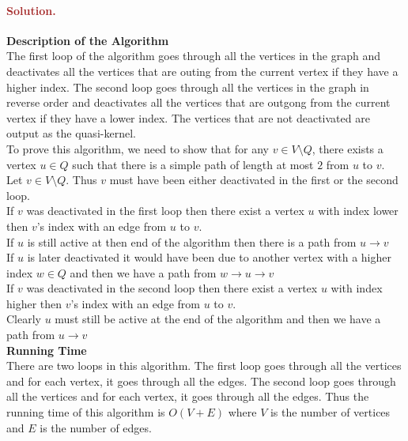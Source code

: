 \paragraph{\textcolor{brown}{Solution.}}
\textbf{Description of the Algorithm}\\
The first loop of the algorithm goes through all the vertices in the graph and deactivates all the vertices that are outing from the current vertex if they have a higher index. The second loop goes through all the vertices in the graph in reverse order and deactivates all the vertices that are outgong from the current vertex if they have a lower index. The vertices that are not deactivated are output as the quasi-kernel.\\
To prove this algorithm, we need to show that for any $v \in V \setminus Q$, there exists a vertex $u \in Q$ such that there is a simple path of length at most $2$ from $u$ to $v$.\\
Let $v \in V \setminus Q$. Thus $v$ must have been either deactivated in the first or the second loop.\\
If $v$ was deactivated in the first loop then there exist a vertex $u$ with index lower then $v$'s index with an edge from $u$ to $v$. \\
If $u$ is still active at then end of the algorithm then there is a path from $u \to v$ \\
If $u$ is later deactivated it would have been due to another vertex with a higher index $w \in Q$ and then we have a path from $w \to u \to v$ \\
If $v$ was deactivated in the second loop then there exist a vertex $u$ with index higher then $v$'s index with an edge from $u$ to $v$. \\
Clearly $u$ must still be active at the end of the algorithm and then we have a path from $u \to v$\\
\textbf{Running Time}\\
There are two loops in this algorithm. The first loop goes through all the vertices and for each vertex, it goes through all the edges. The second loop goes through all the vertices and for each vertex, it goes through all the edges. Thus the running time of this algorithm is $O(V+E)$ where $V$ is the number of vertices and $E$ is the number of edges.\\
